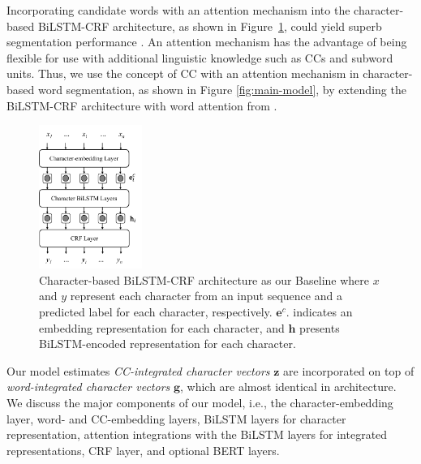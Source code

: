 Incorporating candidate words with an attention mechanism into the character-based BiLSTM-CRF architecture, as shown in Figure~\ref{fig:base-model}, could yield superb segmentation performance \cite{higashiyama-etal-2019-incorporating}.
%
An attention mechanism has the advantage of being flexible for use with additional linguistic knowledge such as CCs and subword units.
%
Thus, we use the concept of CC with an attention mechanism in character-based word segmentation, as shown in Figure \ref{fig:main-model}, by extending the BiLSTM-CRF architecture with word attention from .

\begin{figure}[ht]
    \centering
    \includegraphics[width=0.3\textwidth]{figures/fig-base-model.pdf}
    \caption{Character-based BiLSTM-CRF architecture as our Baseline where $x$ and $y$ represent each character from an input sequence and a predicted label for each character, respectively. $\textbf{e}^{c}$. indicates an embedding representation for each character, and $\textbf{h}$ presents BiLSTM-encoded representation for each character.}
    \label{fig:base-model}
\end{figure}
%
Our model estimates \textit{CC-integrated character vectors} ${\textbf{z}}$ are incorporated on top of \textit{word-integrated character vectors} ${\textbf{g}}$, which are almost identical in architecture.
%
We discuss the major components of our model, i.e., the character-embedding layer, word- and CC-embedding layers, BiLSTM layers for character representation, attention integrations with the BiLSTM layers for integrated representations, CRF layer, and optional BERT layers.
%
